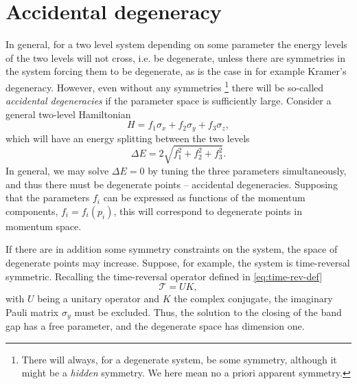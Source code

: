 \section{Accidental degeneracy}
\label{sec:accidental-degeneracy}
In general, for a two level system depending on some parameter the energy levels of the two levels will not cross, i.e. be degenerate, unless there are symmetries in the system forcing them to be degenerate, as is the case in for example Kramer's degeneracy.
However, even without any symmetries%
\footnote{There will always, for a degenerate system, be some symmetry, although it might be a \emph{hidden} symmetry. We here mean no a priori apparent symmetry.}
there will be so-called \emph{accidental degeneracies} if the parameter space is sufficiently large.
Consider a general two-level Hamiltonian
\begin{equation}
  H = f_1 \sigma_x + f_2 \sigma_y + f_3 \sigma_z,
\end{equation}
which will have an energy splitting between the two levels
\begin{equation}
  \Delta E = 2 \sqrt{
    f_1^2 + f_2^2 + f_3^2
  }.
\end{equation}
In general, we may solve $\Delta E = 0$ by tuning the three parameters simultaneously, and thus there must be degenerate points -- accidental degeneracies.
Supposing that the parameters $f_i$ can be expressed as functions of the momentum components, $f_i =f_i(p_i)$, this will correspond to degenerate points in momentum space.

If there are in addition some symmetry constraints on the system, the space of degenerate points may increase.
Suppose, for example, the system is time-reversal symmetric.
Recalling the time-reversal operator defined in \cref{eq:time-rev-def}
$$
\mathcal{T} = UK,
$$
with $U$ being a unitary operator and $K$ the complex conjugate, the imaginary Pauli matrix $\sigma_y$ must be excluded.
Thus, the solution to the closing of the band gap has a free parameter, and the degenerate space has dimension one.
